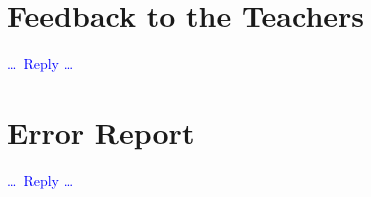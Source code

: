 \documentclass[a4paper,11pt,hidelinks]{article}
\renewcommand{\todo}[1]{\textcolor{blue}{#1}} %
\begin{document}

\bigskip
\section*{Feedback to the Teachers}


\todo{\dots\ Reply \dots}



\bigskip
\section*{Error Report}


\todo{\dots\ Reply \dots}



% 
% 


\end{document}
